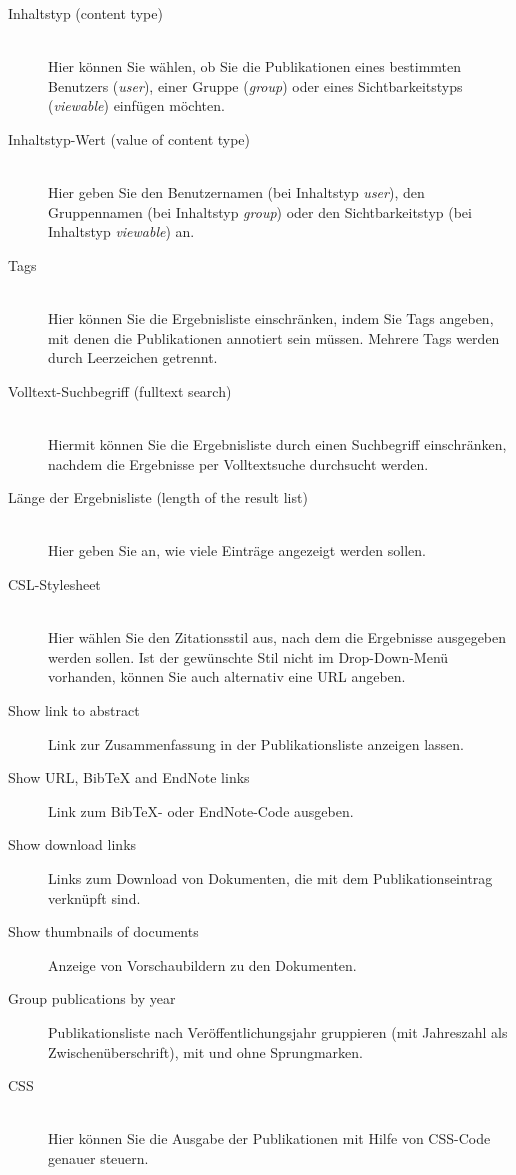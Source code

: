 \begin{description}
\item [Inhaltstyp (content type)] \hfill \\
  Hier können Sie wählen, ob Sie die Publikationen eines bestimmten Benutzers (\textit{user}), einer Gruppe (\textit{group}) oder eines Sichtbarkeitstyps (\textit{viewable}) einfügen möchten.
\item [Inhaltstyp-Wert (value of content type)] \hfill \\
  Hier geben Sie den Benutzernamen (bei Inhaltstyp \textit{user}), den Gruppennamen (bei Inhaltstyp \textit{group}) oder den Sichtbarkeitstyp (bei Inhaltstyp \textit{viewable}) an.
\item [Tags] \hfill \\
  Hier können Sie die Ergebnisliste einschränken, indem Sie Tags angeben, mit denen die Publikationen annotiert sein müssen. Mehrere Tags werden durch Leerzeichen getrennt.
\item [Volltext-Suchbegriff (fulltext search)] \hfill \\
  Hiermit können Sie die Ergebnisliste durch einen Suchbegriff einschränken, nachdem die Ergebnisse per Volltextsuche durchsucht werden.
\item [Länge der Ergebnisliste (length of the result list)] \hfill \\
  Hier geben Sie an, wie viele Einträge angezeigt werden sollen.
\item [CSL-Stylesheet] \hfill \\
  Hier wählen Sie den Zitationsstil aus, nach dem die Ergebnisse ausgegeben werden sollen. Ist der gewünschte Stil nicht im Drop-Down-Menü vorhanden, können Sie auch alternativ eine URL angeben.
\item [Show link to abstract] Link zur Zusammenfassung in der Publikationsliste anzeigen lassen.
\item [Show URL, BibTeX and EndNote links] Link zum BibTeX- oder EndNote-Code ausgeben.
\item [Show download links] Links zum Download von Dokumenten, die mit dem Publikationseintrag verknüpft sind.
\item [Show thumbnails of documents] Anzeige von Vorschaubildern zu den Dokumenten. 
\item [Group publications by year] Publikationsliste nach Veröffentlichungsjahr gruppieren (mit Jahreszahl als Zwischenüberschrift), mit und ohne Sprungmarken.
\item [CSS] \hfill \\
  Hier können Sie die Ausgabe der Publikationen mit Hilfe von CSS-Code genauer steuern.
\end{description}

